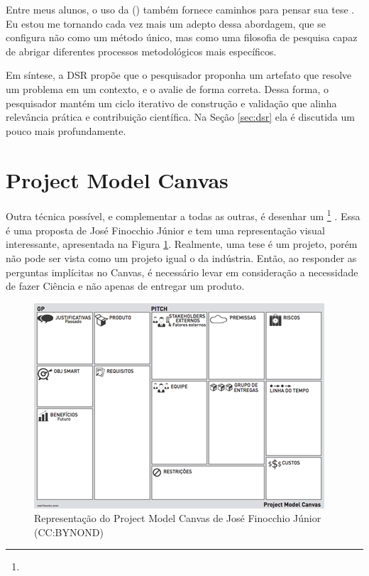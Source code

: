 Entre meus alunos, o uso da  ()\citep{pimentel2023} também fornece caminhos para pensar sua tese . Eu estou me tornando cada vez mais um adepto dessa abordagem, 
que se configura não como um método único, mas como uma filosofia de pesquisa  
capaz de abrigar diferentes processos metodológicos mais específicos\citep{hevner2004design,Dresch2014,march1995design,pimentel2023}.

Em síntese, a DSR propõe que o pesquisador proponha um artefato que resolve um problema em um contexto, e o avalie de forma correta\citep{pimentel2023}.  
Dessa forma, o pesquisador mantém um ciclo iterativo de construção e validação que alinha relevância prática e contribuição científica. Na Seção \ref{sec:dsr} ela é discutida um pouco mais profundamente.

\section{Project Model Canvas}

Outra técnica possível, e complementar a todas as outras, é desenhar um \footnote{} . Essa é uma proposta de José Finocchio Júnior e tem uma representação visual interessante, apresentada na Figura \ref{fig:pmc}. Realmente, uma tese é um projeto, porém não pode ser vista como um projeto igual o da indústria. Então, ao responder as perguntas implícitas no Canvas, é necessário levar em consideração a necessidade de fazer Ciência e não apenas de entregar um produto.

\begin{figure}
    \centering
    \includegraphics[width=0.7\linewidth]{Images/PMC}
    \caption{Representação do Project Model Canvas de José Finocchio Júnior (CC:BYNOND)}
    \label{fig:pmc}
\end{figure}


